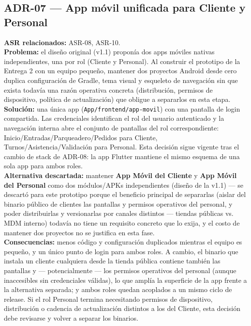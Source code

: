\documentclass[11pt,a4paper]{article}
\begin{document}
\subsection*{ADR-07 --- App móvil unificada para Cliente y Personal}
\textbf{ASR relacionados:} ASR-08, ASR-10.\\
\textbf{Problema:} el diseño original (v1.1) proponía dos apps móviles nativas independientes, una
por rol (Cliente y Personal). Al construir el prototipo de la Entrega 2 con un equipo pequeño, mantener
dos proyectos Android desde cero duplica configuración de Gradle, tema visual y esqueleto de
navegación sin que exista todavía una razón operativa concreta (distribución, permisos de
dispositivo, política de actualización) que obligue a separarlos en esta etapa.\\
\textbf{Solución:} una única app (\texttt{App/frontend/app-movil}) con una pantalla de login
compartida. Las credenciales identifican el rol del usuario autenticado y la navegación interna abre
el conjunto de pantallas del rol correspondiente: Inicio/Entradas/Parqueadero/Pedidos para Cliente,
Turnos/Asistencia/Validación para Personal. Esta decisión sigue vigente tras el cambio de stack de
ADR-08: la app Flutter mantiene el mismo esquema de una sola app para ambos roles.\\
\textbf{Alternativa descartada:} mantener \textbf{App Móvil del Cliente} y \textbf{App Móvil del
Personal} como dos módulos/APKs independientes (diseño de la v1.1) — se descartó para este
prototipo porque el beneficio principal de separarlas (aislar del binario público de clientes las
pantallas y permisos operativos del personal, y poder distribuirlas y versionarlas por canales
distintos — tiendas públicas vs. MDM interno) todavía no tiene un requisito concreto que lo exija, y
el costo de mantener dos proyectos no se justifica en esta fase.\\
\textbf{Consecuencias:} menos código y configuración duplicados mientras el equipo es pequeño, y un
único punto de login para ambos roles. A cambio, el binario que instala un cliente cualquiera desde
la tienda pública contiene también las pantallas y — potencialmente — los permisos operativos del
personal (aunque inaccesibles sin credenciales válidas), lo que amplía la superficie de la app frente
a la alternativa separada; y ambos roles quedan acoplados a un mismo ciclo de release. Si el rol
Personal termina necesitando permisos de dispositivo, distribución o cadencia de actualización
distintos a los del Cliente, esta decisión debe revisarse y volver a separar los binarios.
\end{document}
